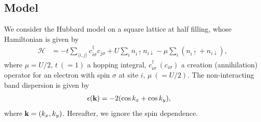 \documentclass[submission, LectureNotes]{SciPost}
\newcommand{\bk}{\ensuremath{{\bf k}}}
\newcommand\ii{\mathrm{i}}%
\newcommand\iv{\ii\nu}%
\begin{document}
\subsection{Model}
We consider the Hubbard model on a square lattice at half filling,
whose Hamiltonian is given by
\begin{align}
    \mathcal{H} &= -t \sum_{\langle i, j\rangle}
        c^\dagger_{i\sigma} c_{j\sigma}
        + U \sum_i n_{i\uparrow} n_{i\downarrow}
        - \mu \sum_i (n_{i\uparrow} + n_{i\downarrow}),
\end{align}
where $\mu = U/2$, $t~(=1)$ a hopping integral,
$c^\dagger_{i\sigma}~(c_{i\sigma})$ a creation (annihilation) operator
for an electron with spin $\sigma$ at site $i$,
$\mu~(=U/2)$.
The non-interacting band dispersion is given by
\begin{align}
    \epsilon(\bk) &= -2 (\cos{k_x} + \cos{k_y}),
\end{align}
where $\bk=(k_x, k_y)$.
Hereafter, we ignore the spin dependence.
%
%
%
%
\end{document}

